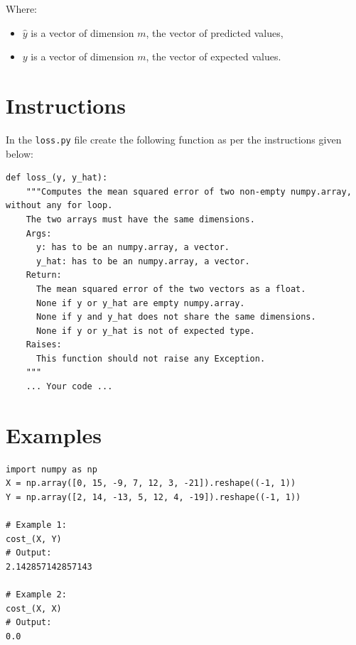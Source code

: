 \documentclass{42-en}
\begin{document}
Where:
\begin{itemize}
  \item $\hat{y}$ is a vector of dimension $m$, the vector of predicted values,
  \item $y$ is a vector of dimension $m$, the vector of expected values.
\end{itemize}


\section*{Instructions}
In the \texttt{loss.py} file create the following function as per the instructions given below:

\begin{verbatim}
def loss_(y, y_hat):
    """Computes the mean squared error of two non-empty numpy.array, without any for loop.
    The two arrays must have the same dimensions.
    Args:
      y: has to be an numpy.array, a vector.
      y_hat: has to be an numpy.array, a vector.
    Return:
      The mean squared error of the two vectors as a float.
      None if y or y_hat are empty numpy.array.
      None if y and y_hat does not share the same dimensions.
      None if y or y_hat is not of expected type.
    Raises:
      This function should not raise any Exception.
    """
    ... Your code ...
\end{verbatim}

\section*{Examples}
\begin{verbatim}
import numpy as np
X = np.array([0, 15, -9, 7, 12, 3, -21]).reshape((-1, 1))
Y = np.array([2, 14, -13, 5, 12, 4, -19]).reshape((-1, 1))

# Example 1:
cost_(X, Y)
# Output:
2.142857142857143

# Example 2:
cost_(X, X)
# Output:
0.0
\end{verbatim}



\newpage

\end{document}
